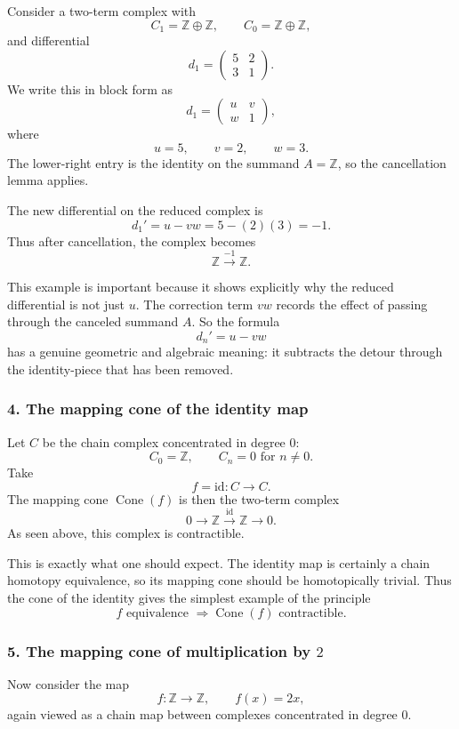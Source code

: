 \documentclass[12pt,a4paper]{article}
\theoremstyle{notespace}
\begin{document}
Consider a two-term complex with
\[
C_1=\mathbb Z\oplus \mathbb Z,\qquad C_0=\mathbb Z\oplus \mathbb Z,
\]
and differential
\[
d_1=
\begin{pmatrix}
	5 & 2\\
	3 & 1
\end{pmatrix}.
\]
We write this in block form as
\[
d_1=
\begin{pmatrix}
	u & v\\
	w & 1
\end{pmatrix},
\]
where
\[
u=5,\qquad v=2,\qquad w=3.
\]
The lower-right entry is the identity on the summand \(A=\mathbb Z\), so the cancellation lemma applies.

The new differential on the reduced complex is
\[
d_1'=u-vw=5-(2)(3)=-1.
\]
Thus after cancellation, the complex becomes
\[
\mathbb Z \xrightarrow{-1} \mathbb Z.
\]

This example is important because it shows explicitly why the reduced differential is not just \(u\). The correction term \(vw\) records the effect of passing through the canceled summand \(A\). So the formula
\[
d_n'=u-vw
\]
has a genuine geometric and algebraic meaning: it subtracts the detour through the identity-piece that has been removed.

\subsubsection*{4. The mapping cone of the identity map}

Let \(C\) be the chain complex concentrated in degree \(0\):
\[
C_0=\mathbb Z,\qquad C_n=0 \text{ for } n\neq 0.
\]
Take
\[
f=\mathrm{id}:C\to C.
\]
The mapping cone \(\operatorname{Cone}(f)\) is then the two-term complex
\[
0\longrightarrow \mathbb Z \xrightarrow{\mathrm{id}} \mathbb Z \longrightarrow 0.
\]
As seen above, this complex is contractible.

This is exactly what one should expect. The identity map is certainly a chain homotopy equivalence, so its mapping cone should be homotopically trivial. Thus the cone of the identity gives the simplest example of the principle
\[
f \text{ equivalence } \Longrightarrow \operatorname{Cone}(f) \text{ contractible}.
\]

\subsubsection*{5. The mapping cone of multiplication by \(2\)}

Now consider the map
\[
f:\mathbb Z\to \mathbb Z,\qquad f(x)=2x,
\]
again viewed as a chain map between complexes concentrated in degree \(0\).
\end{document}
